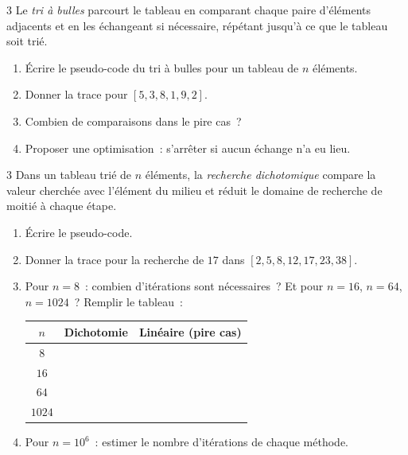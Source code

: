\begin{exo}{3}
Le \emph{tri \`a bulles} parcourt le tableau en comparant chaque paire
d'\'el\'ements adjacents et en les \'echangeant si n\'ecessaire, r\'ep\'etant
jusqu'\`a ce que le tableau soit tri\'e.
\begin{enumerate}
  \item \'Ecrire le pseudo-code du tri \`a bulles pour un tableau de $n$ \'el\'ements.
  \item Donner la trace pour $[5, 3, 8, 1, 9, 2]$.
  \item Combien de comparaisons dans le pire cas~?
  \item Proposer une optimisation~: s'arr\^eter si aucun \'echange n'a eu lieu.
\end{enumerate}
\end{exo}

\begin{exo}{3}
Dans un tableau tri\'e de $n$ \'el\'ements, la \emph{recherche dichotomique}
compare la valeur cherch\'ee avec l'\'el\'ement du milieu et r\'eduit le
domaine de recherche de moiti\'e \`a chaque \'etape.
\begin{enumerate}
  \item \'Ecrire le pseudo-code.
  \item Donner la trace pour la recherche de $17$ dans
        $[2, 5, 8, 12, 17, 23, 38]$.
  \item Pour $n=8$~: combien d'it\'erations sont n\'ecessaires~?
        Et pour $n=16$, $n=64$, $n=1024$~? Remplir le tableau~:
        \begin{center}
        \renewcommand{\arraystretch}{1.3}
        \begin{tabular}{|c|c|c|}
        \hline
        \rowcolor{BN!10}$n$ & Dichotomie & Lin\'eaire (pire cas) \\ \hline
        $8$ & & \\ $16$ & & \\ $64$ & & \\ $1024$ & & \\ \hline
        \end{tabular}
        \end{center}
  \item Pour $n = 10^6$~: estimer le nombre d'it\'erations de chaque m\'ethode.

\end{enumerate}
\end{exo}

